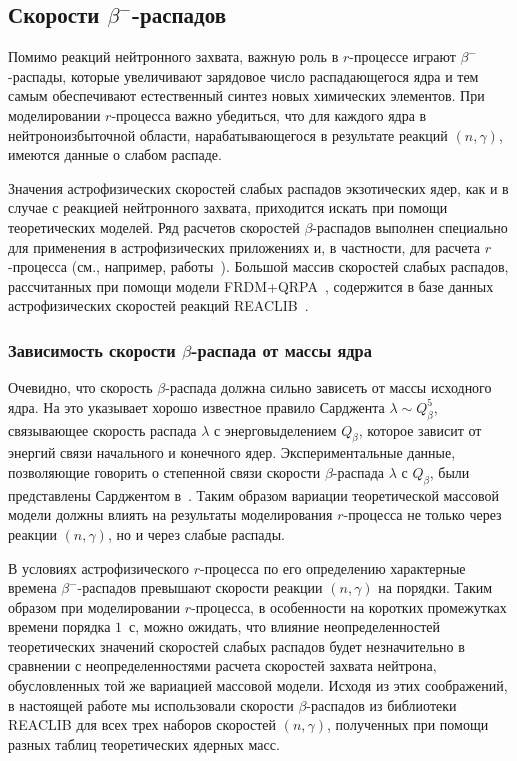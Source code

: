 \subsection{Скорости $\beta^-$-распадов} \label{sec:weakfit}
  Помимо реакций нейтронного захвата, важную роль в $r$-процессе играют $\beta^-$-распады, которые увеличивают зарядовое число распадающегося ядра и тем самым обеспечивают естественный синтез новых химических элементов. При моделировании $r$-процесса важно убедиться, что для каждого ядра в нейтроноизбыточной области, нарабатывающегося в результате реакций $(n,\gamma)$, имеются данные о слабом распаде.

Значения астрофизических скоростей слабых распадов экзотических ядер, как и в случае с реакцией нейтронного захвата, приходится искать при помощи теоретических моделей. Ряд расчетов скоростей $\beta$-распадов выполнен специально для применения в астрофизических приложениях и, в частности, для расчета $r$-процесса (см., например, работы~\cite{moller2003, panov2016}). Большой массив скоростей слабых распадов, рассчитанных при помощи модели FRDM+QRPA~\cite{moller2003}, содержится в базе данных астрофизических скоростей реакций REACLIB~\cite{reaclib2010}.

\subsubsection{Зависимость скорости $\beta$-распада от массы ядра}
  Очевидно, что скорость $\beta$-распада должна сильно зависеть от массы исходного ядра. На это указывает хорошо известное правило Сарджента $\lambda \sim Q_\beta^5$, связывающее скорость распада $\lambda$ с энерговыделением $Q_\beta$, которое зависит от энергий связи начального и конечного ядер. Экспериментальные данные, позволяющие говорить о степенной связи скорости $\beta$-распада $\lambda$ с $Q_\beta$, были представлены Сарджентом в~\cite{sargent1933}. Таким образом вариации теоретической массовой модели должны влиять на результаты моделирования $r$-процесса не только через реакции $(n,\gamma)$, но и через слабые распады. 

  В условиях астрофизического $r$-процесса по его определению характерные времена $\beta^-$-распадов превышают скорости реакции $(n,\gamma)$ на порядки. Таким образом при моделировании $r$-процесса, в особенности на коротких промежутках времени порядка $1$~с, можно ожидать, что влияние неопределенностей теоретических значений скоростей слабых распадов будет незначительно в сравнении с неопределенностями расчета скоростей захвата нейтрона, обусловленных той же вариацией массовой модели. Исходя из этих соображений, в настоящей работе мы использовали скорости $\beta$-распадов из библиотеки REACLIB для всех трех наборов скоростей $(n,\gamma)$, полученных при помощи разных таблиц теоретических ядерных масс.

